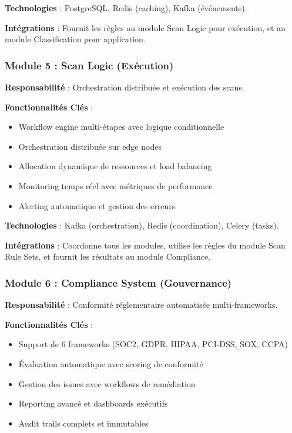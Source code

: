 \textbf{Technologies} : PostgreSQL, Redis (caching), Kafka (événements).

\textbf{Intégrations} : Fournit les règles au module Scan Logic pour exécution, et au module Classification pour application.

\subsubsection{Module 5 : Scan Logic (Exécution)}

\textbf{Responsabilité} : Orchestration distribuée et exécution des scans.

\textbf{Fonctionnalités Clés} :
\begin{itemize}
    \item Workflow engine multi-étapes avec logique conditionnelle
    \item Orchestration distribuée sur edge nodes
    \item Allocation dynamique de ressources et load balancing
    \item Monitoring temps réel avec métriques de performance
    \item Alerting automatique et gestion des erreurs
\end{itemize}

\textbf{Technologies} : Kafka (orchestration), Redis (coordination), Celery (tasks).

\textbf{Intégrations} : Coordonne tous les modules, utilise les règles du module Scan Rule Sets, et fournit les résultats au module Compliance.

\subsubsection{Module 6 : Compliance System (Gouvernance)}

\textbf{Responsabilité} : Conformité réglementaire automatisée multi-frameworks.

\textbf{Fonctionnalités Clés} :
\begin{itemize}
    \item Support de 6 frameworks (SOC2, GDPR, HIPAA, PCI-DSS, SOX, CCPA)
    \item Évaluation automatique avec scoring de conformité
    \item Gestion des issues avec workflows de remédiation
    \item Reporting avancé et dashboards exécutifs
    \item Audit trails complets et immutables
\end{itemize}

